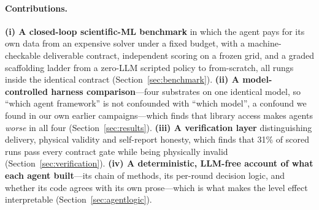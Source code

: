 \paragraph{Contributions.}
\textbf{(i) A closed-loop scientific-ML benchmark} in which the agent pays for
its own data from an expensive solver under a fixed budget, with a
machine-checkable deliverable contract, independent scoring on a frozen grid,
and a graded scaffolding ladder from a zero-LLM scripted policy to from-scratch,
all rungs inside the identical contract (Section~\ref{sec:benchmark}).
\textbf{(ii) A model-controlled harness comparison}---four substrates on one
identical model, so ``which agent framework'' is not confounded with ``which
model'', a confound we found in our own earlier campaigns---which finds that
library access makes agents \emph{worse} in all four
(Section~\ref{sec:results}).
\textbf{(iii) A verification layer} distinguishing delivery, physical validity
and self-report honesty, which finds that 31\% of scored runs pass every
contract gate while being physically invalid
(Section~\ref{sec:verification}).
\textbf{(iv) A deterministic, LLM-free account of what each agent built}---its
chain of methods, its per-round decision logic, and whether its code agrees with
its own prose---which is what makes the level effect interpretable
(Section~\ref{sec:agentlogic}).
